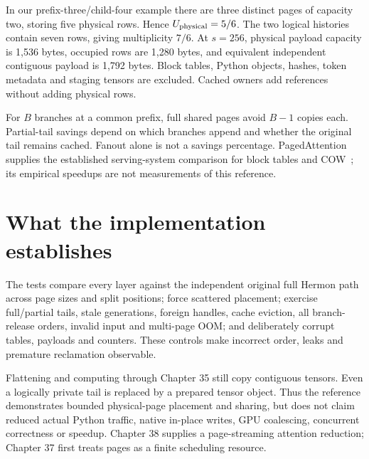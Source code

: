 In our prefix-three/child-four example there are three distinct pages of
capacity two, storing five physical rows. Hence $U_{\rm physical}=5/6$.
The two logical histories contain seven rows, giving multiplicity $7/6$.
At $s=256$, physical payload capacity is 1,536 bytes, occupied rows are
1,280 bytes, and equivalent independent contiguous payload is 1,792 bytes.
Block tables, Python objects, hashes, token metadata and staging tensors
are excluded. Cached owners add references without adding physical rows.

\begin{center}\end{center}

For $B$ branches at a common prefix, full shared pages avoid $B-1$ copies
each. Partial-tail savings depend on which branches append and whether the
original tail remains cached. Fanout alone is not a savings percentage.
PagedAttention supplies the established serving-system comparison
for block tables and COW~\cite{evod36:kwon}; its empirical speedups are
not measurements of this reference.

\section{What the implementation establishes}
\label{evod36:evidence}
The tests compare every layer against the independent original full Hermon
path across page sizes and split positions; force scattered placement;
exercise full/partial tails, stale generations, foreign handles, cache
eviction, all branch-release orders, invalid input and multi-page OOM;
and deliberately corrupt tables, payloads and counters. These controls
make incorrect order, leaks and premature reclamation observable.

Flattening and computing through Chapter 35 still copy contiguous tensors.
Even a logically private tail is replaced by a prepared tensor object.
Thus the reference demonstrates bounded physical-page placement and sharing,
but does not claim reduced actual Python traffic, native in-place writes,
GPU coalescing, concurrent correctness or speedup. Chapter 38 supplies a
page-streaming attention reduction; Chapter 37 first treats pages as a
finite scheduling resource.

